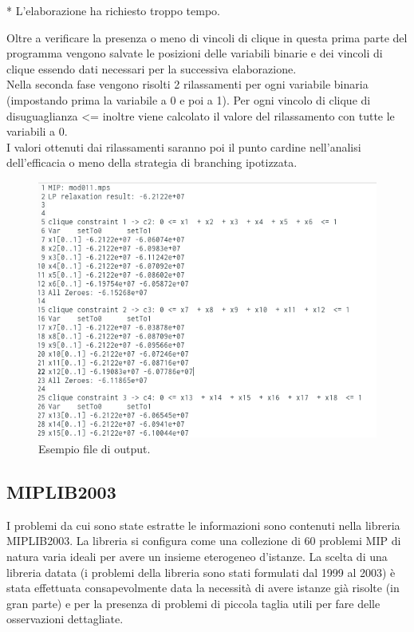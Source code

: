 \documentclass[12pt,a4paper,twoside,openright]{book}
\begin{document}
\begin{center}
    * L'elaborazione ha richiesto troppo tempo.
\end{center}
Oltre a verificare la presenza o meno di vincoli di clique in questa prima parte del programma
vengono salvate le posizioni delle variabili binarie e dei vincoli di clique essendo dati 
necessari per la successiva elaborazione.\\ Nella seconda fase vengono risolti 2 rilassamenti 
per ogni variabile binaria (impostando prima la variabile a 0 e poi a 1). Per ogni vincolo 
di clique di disuguaglianza <= inoltre viene calcolato il valore del rilassamento con tutte le variabili a 0.\\I valori 
ottenuti dai rilassamenti saranno poi il punto cardine nell'analisi dell'efficacia o meno
della strategia di branching ipotizzata. \\
\begin{figure}[ht]
    \centering
    \includegraphics [scale = 0.5]{output_example.png}
    \caption{Esempio file di output.}
    \label{fig:output}
\end{figure}

\subsection{MIPLIB2003}
I problemi da cui sono state estratte le informazioni sono contenuti nella libreria MIPLIB2003.
La libreria si configura come una collezione di 60 problemi MIP di natura varia ideali per avere
un insieme eterogeneo d'istanze. La scelta di una libreria datata (i problemi della libreria 
sono stati formulati dal 1999 al 2003) è stata effettuata consapevolmente data la necessità di avere 
istanze già risolte (in gran parte) e per la presenza di problemi di piccola taglia utili per fare delle osservazioni dettagliate.
\end{document}
